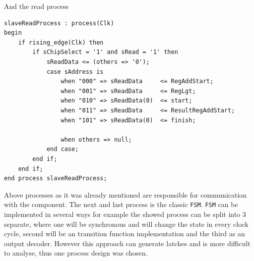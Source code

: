 And the read process
\begin{verbatim}
slaveReadProcess : process(Clk) 
begin
    if rising_edge(Clk) then
        if sChipSelect = '1' and sRead = '1' then
            sReadData <= (others => '0');
            case sAddress is
                when "000" => sReadData     <= RegAddStart; 
                when "001" => sReadData     <= RegLgt;
                when "010" => sReadData(0)  <= start;
                when "011" => sReadData     <= ResultRegAddStart; 
                when "101" => sReadData(0)  <= finish;
                
                when others => null;
            end case;
        end if;
    end if;
end process slaveReadProcess;
\end{verbatim}
Above processes as it was already mentioned are responsible for communication with the component. The next and last process is the classic \verb|FSM|. \verb|FSM| can be implemented in several ways for example the showed process can be split into 3 separate, where one will be synchronous and will change the state in every clock cycle, second will be an transition function implementation and the third as an output decoder. However this approach can generate latches and is more difficult to analyse, thus one process design was chosen. 
